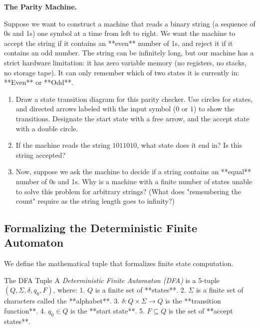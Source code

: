 \documentclass[12pt, a4paper]{book}
\newcommand{\newterm}[1]{\textit{\textcolor{DiscoveryColor}{#1}}}
\begin{document}
\begin{puzzlebox}
\textbf{The Parity Machine.}

Suppose we want to construct a machine that reads a binary string (a sequence of 0s and 1s) one symbol at a time from left to right.
We want the machine to accept the string if it contains an **even** number of 1s, and reject it if it contains an odd number.
The string can be infinitely long, but our machine has a strict hardware limitation: it has zero variable memory (no registers, no stacks, no storage tape). It can only remember which of two states it is currently in: **Even** or **Odd**.
\begin{enumerate}[label=(\alph*), leftmargin=*]
  \item Draw a state transition diagram for this parity checker. Use circles for states, and directed arrows labeled with the input symbol ($0$ or $1$) to show the transitions.
        Designate the start state with a free arrow, and the accept state with a double circle.
  \item If the machine reads the string $1011010$, what state does it end in? Is this string accepted?
  \item Now, suppose we ask the machine to decide if a string contains an **equal** number of 0s and 1s.
        Why is a machine with a finite number of states unable to solve this problem for arbitrary strings? (What does "remembering the count" require as the string length goes to infinity?)
\end{enumerate}
\end{puzzlebox}

\subsection{Formalizing the Deterministic Finite Automaton}

We define the mathematical tuple that formalizes finite state computation.

\begin{namedconcept}{The DFA Tuple}
A \newterm{Deterministic Finite Automaton (DFA)} is a 5-tuple $(Q, \Sigma, \delta, q_0, F)$, where:
1. $Q$ is a finite set of **states**.
2. $\Sigma$ is a finite set of characters called the **alphabet**.
3. $\delta: Q \times \Sigma \to Q$ is the **transition function**.
4. $q_0 \in Q$ is the **start state**.
5. $F \subseteq Q$ is the set of **accept states**.
\end{namedconcept}
\end{document}
